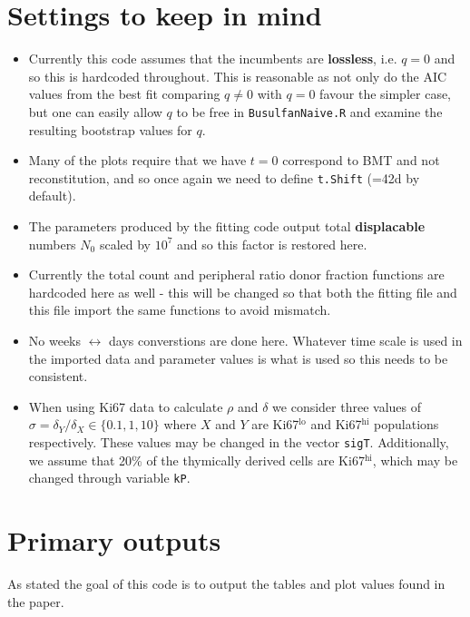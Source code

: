 \documentclass{tufte-book} %
\begin{document}
\section{Settings to keep in mind}
\begin{itemize}
\item Currently this code assumes that the incumbents are \textbf{lossless}, i.e. $q=0$ and so this is hardcoded throughout. This is reasonable as not only do the AIC values from the best fit comparing $q\neq 0$ with $q=0$ favour the simpler case, but one can easily allow $q$ to be free in \texttt{BusulfanNaive.R} and examine the resulting bootstrap values for $q$.  

\item Many of the plots require that we have $t=0$ correspond to BMT and not reconstitution, and so once again we need to define \texttt{t.Shift} (=42d by default).

\item The parameters produced by the fitting code output total \textbf{displacable} numbers $N_0$ scaled by $10^7$ and so this factor is restored here.

\item Currently the total count and peripheral ratio donor fraction functions are hardcoded here as well - this will be changed so that both the fitting file and this file import the same functions to avoid mismatch.

\item No weeks $	\leftrightarrow$ days converstions are done here. Whatever time scale is used in the imported data and parameter values is what is used so this needs to be consistent.

\item {} When using Ki67 data to calculate $\rho$ and $\delta$ we consider three values of $\sigma= \delta_Y/\delta_X \in \{0.1,1,10\}$ where $X$ and $Y$ are Ki67$^{\textrm{lo}}$ and Ki67$^{\textrm{hi}}$ populations respectively. These values may be changed in the vector \texttt{sigT}. Additionally, we assume that 20\% of the thymically derived cells are Ki67$^{\textrm{hi}}$, which may be changed through variable \texttt{kP}.
\end{itemize}

\section{Primary outputs}

As stated the goal of this code is to output the tables and plot values found in the paper.
\end{document}
